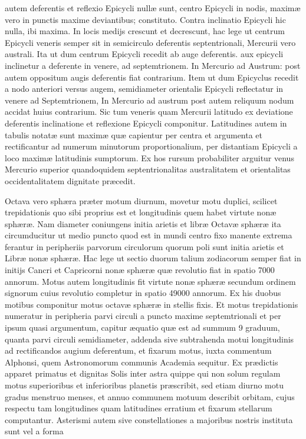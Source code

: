 \documentclass[11pt,a4paper]{article}
\begin{document}
autem deferentis et reflexio Epicycli nullæ sunt, centro Epicycli in nodis, maximæ vero in punctis maxime deviantibus; constituto. Contra inclinatio Epicycli hic nulla, ibi maxima. In locis medijs crescunt et decrescunt, hac lege ut centrum Epicycli veneris semper sit in semicirculo deferentis septentrionali, Mercurii vero australi. Ita ut dum centrum Epicycli recedit ab auge deferentis. aux epicycli inclinetur a deferente in venere, ad septemtrionem. In Mercurio ad Austrum: post autem oppositum augis deferentis fiat contrarium. Item ut dum  Epicyclus recedit a nodo anteriori versus augem, semidiameter orientalis Epicycli reflectatur in venere ad Septemtrionem, In Mercurio ad austrum post autem reliquum nodum accidat huius contrarium. Sic tum veneris quam Mercurii latitudo ex deviatione deferentis inclinatione et reflexione Epicycli componitur. Latitudines autem in tabulis notatæ sunt maximæ quæ capientur per centra et argumenta et rectificantur ad numerum minutorum proportionalium, per distantiam Epicycli a loco maximæ latitudinis sumptorum. Ex hos rursum probabiliter arguitur venus Mercurio superior quandoquidem septentrionalitas australitatem et orientalitas occidentalitatem dignitate præcedit.

Octava vero sphæra præter motum diurnum, movetur motu duplici, scilicet trepidationis quo sibi proprius est et longitudinis quem habet virtute nonæ sphæræ. Nam diameter coniungens initia arietis et libræ Octavæ sphæræ ita circumducitur ut medio puncto quod est in mundi centro fixo manente extrema ferantur in peripheriis parvorum circulorum quorum poli sunt initia arietis et Libræ nonæ sphæræ. Hac lege ut sectio duorum talium zodiacorum semper fiat in initijs Cancri et Capricorni nonæ sphæræ quæ revolutio fiat in spatio 7000 annorum. Motus autem longitudinis fit virtute nonæ sphæræ secundum ordinem signorum cuius revolutio completur in spatio 49000 annorum. Ex his duobus motibus componitur motus octavæ sphæræ in stellis fixis. Et motus trepidationis numeratur in peripheria parvi circuli a puncto maxime septemtrionali et per ipsum quasi argumentum, capitur æquatio quæ est ad summum 9 graduum, quanta parvi circuli semidiameter, addenda sive subtrahenda motui longitudinis ad rectificandos augium deferentum, et fixarum motus, iuxta commentum Alphonsi, quem Astronomorum communis Academia sequitur. Ex prædictis apparet primatus et dignitas Solis inter astra quippe qui non solum regulam motus superioribus et inferioribus planetis præscribit, sed etiam diurno motu gradus menstruo menses, et annuo communem motuum describit orbitam, cujus respectu tam longitudines quam latitudines erratium et fixarum stellarum computantur. Asterismi autem sive constellationes a majoribus nostris instituta sunt vel a forma
\end{document}
